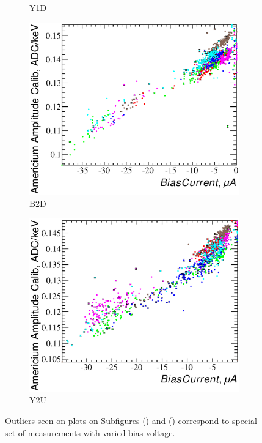 \documentclass[a4paper,12pt]{article}
\begin{document}
\begin{figure}
\begin{subfigure}[b]{0.5\textwidth}
\caption{Y1D}\label{bc_vs_gain-y1d}
\end{subfigure}

\begin{subfigure}[b]{0.5\textwidth}
\includegraphics[width=\textwidth]{gfx/run13_alpha_study/B2D/c_hBiasCurrent_AmGain.eps}
\caption{B2D}\label{bc_vs_gain-b2d}
\end{subfigure}
\begin{subfigure}[b]{0.5\textwidth}
\includegraphics[width=\textwidth]{gfx/run13_alpha_study/Y2U/c_hBiasCurrent_AmGain.eps}
\caption{Y2U}\label{bc_vs_gain-y2u}
\end{subfigure}

\caption{\bcvsgainlabel{}
Outliers seen on plots on Subfigures () and ()
correspond to special set of measurements with varied bias voltage.
}
\label{fig:bc_vs_gain}
\end{figure}
\end{document}
